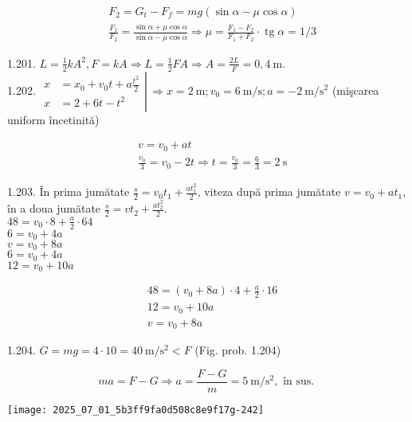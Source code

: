 $$
\begin{aligned}
& F_{2}=G_{t}-F_{f}=m g(\sin \alpha-\mu \cos \alpha) \\
& \frac{F_{1}}{F_{2}}=\frac{\sin \alpha+\mu \cos \alpha}{\sin \alpha-\mu \cos \alpha} \Rightarrow \mu=\frac{F_{1}-F_{2}}{F_{1}+F_{2}} \cdot \operatorname{tg} \alpha=1 / 3
\end{aligned}
$$

1.201. $L=\frac{1}{2} k A^{2}, F=k A \Rightarrow L=\frac{1}{2} F A \Rightarrow A=\frac{2 L}{F}=0,4 \mathrm{~m}$.\\
1.202. $\left.\begin{aligned} x & =x_{0}+v_{0} t+a \frac{t^{2}}{2} \\ x & =2+6 t-t^{2}\end{aligned} \right\rvert\, \Rightarrow x=2 \mathrm{~m} ; v_{0}=6 \mathrm{~m} / \mathrm{s} ; a=-2 \mathrm{~m} / \mathrm{s}^{2}$ (mişcarea uniform încetinită)

$$
\begin{aligned}
& v=v_{0}+a t \\
& \frac{v_{0}}{3}=v_{0}-2 t \Rightarrow t=\frac{v_{0}}{3}=\frac{6}{3}=2 \mathrm{~s}
\end{aligned}
$$

1.203. În prima jumătate $\frac{s}{2}=v_{0} t_{1}+\frac{a t_{1}^{2}}{2}$, viteza după prima jumătate $v=v_{0}+a t_{1}$, în a doua jumătate $\frac{s}{2}=v t_{2}+\frac{a t_{2}^{2}}{2}$.\\
$48=v_{0} \cdot 8+\frac{a}{2} \cdot 64$\\
$6=v_{0}+4 a$\\
$v=v_{0}+8 a$\\
$6=v_{0}+4 a$\\
$12=v_{0}+10 a$

$$
\begin{aligned}
& 48=\left(v_{0}+8 a\right) \cdot 4+\frac{a}{2} \cdot 16 \\
& 12=v_{0}+10 a \\
& v=v_{0}+8 a
\end{aligned}
$$

1.204. $G=m g=4 \cdot 10=40 \mathrm{~m} / \mathrm{s}^{2}<F$ (Fig. prob. 1.204)

$$
m a=F-G \Rightarrow a=\frac{F-G}{m}=5 \mathrm{~m} / \mathrm{s}^{2}, \text { în sus. }
$$

\begin{center}
\texttt{[image: 2025\_07\_01\_5b3ff9fa0d508c8e9f17g-242]}
\end{center}

